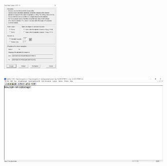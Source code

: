 \documentclass{article}
\begin{document}
\begin{figure}[H]
    \centering
    \includegraphics[width=0.25\textwidth]{figures/1b.jpg}
    \caption
	{}
    \label{fig:fig1}
\end{figure}

\begin{figure}[H]
    \centering
    \includegraphics[width=0.75\textwidth]{figures/1c.jpg}
    \caption
	{}
    \label{fig:fig1}
\end{figure}
\end{document}
